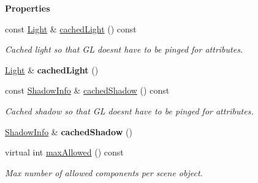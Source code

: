 \begin{Indent}\textbf{ Properties}\par
\begin{DoxyCompactItemize}
\item 
\mbox{\label{classrev_1_1_light_component_a95608f54c558516586be30d20d551716}} 
const \mbox{\hyperlink{classrev_1_1_light}{Light}} \& \mbox{\hyperlink{classrev_1_1_light_component_a95608f54c558516586be30d20d551716}{cached\+Light}} () const
\begin{DoxyCompactList}\small\item\em Cached light so that GL doesn\textquotesingle{}t have to be pinged for attributes. \end{DoxyCompactList}\item 
\mbox{\label{classrev_1_1_light_component_a1985bc7eeded6c119ca0865238332f47}} 
\mbox{\hyperlink{classrev_1_1_light}{Light}} \& {\bfseries cached\+Light} ()
\item 
\mbox{\label{classrev_1_1_light_component_a04569a9385216fbb01000c3de85a9b03}} 
const \mbox{\hyperlink{structrev_1_1_shadow_info}{Shadow\+Info}} \& \mbox{\hyperlink{classrev_1_1_light_component_a04569a9385216fbb01000c3de85a9b03}{cached\+Shadow}} () const
\begin{DoxyCompactList}\small\item\em Cached shadow so that GL doesn\textquotesingle{}t have to be pinged for attributes. \end{DoxyCompactList}\item 
\mbox{\label{classrev_1_1_light_component_a254fd03d8dfe5eabebe01e6627e7eccb}} 
\mbox{\hyperlink{structrev_1_1_shadow_info}{Shadow\+Info}} \& {\bfseries cached\+Shadow} ()
\item 
\mbox{\label{classrev_1_1_light_component_af11f9de700582bcf3f5f80ef66adf89b}} 
virtual int \mbox{\hyperlink{classrev_1_1_light_component_af11f9de700582bcf3f5f80ef66adf89b}{max\+Allowed}} () const
\begin{DoxyCompactList}\small\item\em Max number of allowed components per scene object. \end{DoxyCompactList}\item 

\end{DoxyCompactItemize}
\end{Indent}
